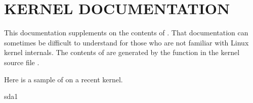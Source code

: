 \documentclass[letterpaper,10pt,english]{sphinxmanual}
\begin{document}
\section{KERNEL DOCUMENTATION}
\label{\detokenize{mariadb-iostat:kernel-documentation}}
This documentation supplements  on the
contents of .  That documentation can sometimes be difficult
to understand for those who are not familiar with Linux kernel internals.  The
contents of  are generated by the  function
in the kernel source file .

Here is a sample of  on a recent kernel.

\begin{sphinxVerbatim}[commandchars=\\\{\}]
  sda1           
\end{sphinxVerbatim}
\end{document}
